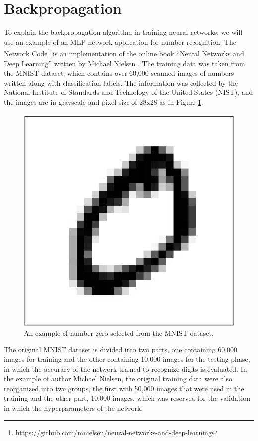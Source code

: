 \section{Backpropagation}\label{backpropagation}

To explain the backpropagation algorithm in training neural networks, we will use an example of an MLP network application for number recognition. The Network Code\footnote{https://github.com/mnielsen/neural-networks-and-deep-learning} is an implementation of the online book “Neural Networks and Deep Learning” written by Michael Nielsen \cite{nielsen2015}. The training data was taken from the MNIST dataset, which contains over 60,000 scanned images of numbers written along with classification labels. The information was collected by the National Institute of Standards and Technology of the United States (NIST), and the images are in grayscale and pixel size of 28x28 as in Figure \ref{fig:figure110}.

\begin{figure}
    \centering
    \includegraphics[scale=0.5]{"Part 3 - Learning Systems/Supervised Learning/Deep Learning/images/figure110.png"}
    \caption{An example of number zero selected from the MNIST dataset.}
    \label{fig:figure110}
\end{figure}

The original MNIST dataset is divided into two parts, one containing 60,000 images for training and the other containing 10,000 images for the testing phase, in which the accuracy of the network trained to recognize digits is evaluated. In the example of author Michael Nielsen, the original training data were also reorganized into two groups, the first with 50,000 images that were used in the training and the other part, 10,000 images, which was reserved for the validation in which the hyperparameters of the network.

